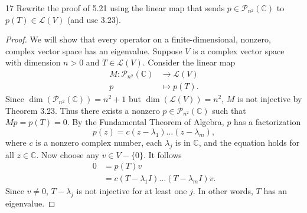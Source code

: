 \documentclass{extarticle}
\newenvironment{problem}[1]{\begin{prob*}{#1}{}}{\end{prob*}}
\newcommand{\C}{\mathbb{C}}
\newcommand{\poly}{\mathcal{P}}
\newcommand{\Hom}{\mathcal{L}}
\begin{document}
\begin{problem}{17}
Rewrite the proof of 5.21 using the linear map that sends $p\in\poly_{n^2}(\C)$ to $p(T)\in\Hom(V)$ (and use 3.23).
\end{problem}
\begin{proof}
We will show that every operator on a finite-dimensional, nonzero, complex vector space has an eigenvalue.  Suppose $V$ is a complex vector space with dimension $n > 0$ and $T\in\Hom(V)$.  Consider the linear map
\begin{align*}
M: \poly_{n^2}(\C) &\to \Hom(V)\\
         p &\mapsto p(T).
\end{align*}
Since $\dim\left(\poly_{n^2}(\C)\right)=n^2 +1$ but $\dim\left(\Hom(V)\right) = n^2$, $M$ is not injective by Theorem 3.23.  Thus there exists a nonzero $p\in\poly_{n^2}(\C)$ such that $Mp = p(T) = 0$.  By the Fundamental Theorem of Algebra, $p$ has a factorization
\begin{equation*}
p(z) = c(z - \lambda_1)\dots (z - \lambda_m),
\end{equation*}  
where $c$ is a nonzero complex number, each $\lambda_j$ is in $\C$, and the equation holds for all $z\in\C$.  Now choose any $v\in V-\{0\}$.  It follows
\begin{align*}
0 &= p(T)v\\
&= c(T - \lambda_1 I)\dots (T - \lambda_m I)v.
\end{align*}
Since $v\neq 0$, $T-\lambda_j$ is not injective for at least one $j$.  In other words, $T$ has an eigenvalue.
\end{proof}
\end{document}
